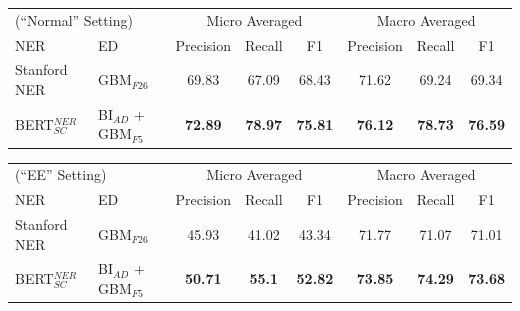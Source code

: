 \documentclass{report}
\theoremstyle{definition}
\theoremstyle{remark}
\begin{document}
\begin{table}
    \centering
    \vspace{-1.5cm}\begin{tabular}{l l c c c| c c c}
    \multicolumn{2}{l}{(``Normal'' Setting)}&\multicolumn{3}{c|}{Micro Averaged}&\multicolumn{3}{c}{Macro Averaged} \\
    NER & ED &Precision&Recall&F1&Precision&Recall&F1\\
    \hline
    Stanford NER& GBM$_{F26}$ & 69.83	&67.09&	68.43&	71.62&	69.24&	69.34
\\
    BERT$_{SC}^{NER}$ & BI$_{AD}$ + GBM$_{F5}$ & \textcolor{ao}{\textbf{72.89}}&\textcolor{ao}{\textbf{78.97}}&\textcolor{ao}{\textbf{75.81}}&\textcolor{ao}{\textbf{76.12}}&\textcolor{ao}{\textbf{78.73}}&\textcolor{ao}{\textbf{76.59}}\\
    \end{tabular}
    
    \vspace{0.5cm}\begin{tabular}{l l c c c| c c c}
    \multicolumn{2}{l}{(``EE'' Setting)}&\multicolumn{3}{c|}{Micro Averaged}&\multicolumn{3}{c}{Macro Averaged} \\
    NER & ED &Precision&Recall&F1&Precision&Recall&F1\\
    \hline
    Stanford NER & GBM$_{F26}$ & 45.93&	41.02&	43.34&	71.77&	71.07	&71.01
\\
    BERT$_{SC}^{NER}$ & BI$_{AD}$ + GBM$_{F5}$ &\textcolor{ao}{\textbf{50.71}}&\textcolor{ao}{\textbf{55.1}}&\textcolor{ao}{\textbf{52.82}}&\textcolor{ao}{\textbf{73.85}}&\textcolor{ao}{\textbf{74.29}}&\textcolor{ao}{\textbf{73.68}} \\
    \end{tabular}
    

\end{table}
\end{document}
